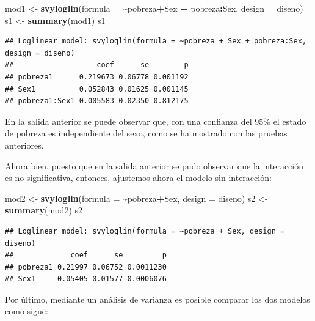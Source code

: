\documentclass[
  spanish,
  12pt,
]{book}
\newenvironment{Shaded}{\begin{snugshade}}{\end{snugshade}}
\newcommand{\AttributeTok}[1]{\textcolor[rgb]{0.13,0.29,0.53}{#1}}
\newcommand{\FunctionTok}[1]{\textcolor[rgb]{0.13,0.29,0.53}{\textbf{#1}}}
\newcommand{\NormalTok}[1]{#1}
\newcommand{\OtherTok}[1]{\textcolor[rgb]{0.56,0.35,0.01}{#1}}
\newcommand{\SpecialCharTok}[1]{\textcolor[rgb]{0.81,0.36,0.00}{\textbf{#1}}}
\begin{document}
\begin{Shaded}
\begin{Highlighting}[]
\NormalTok{mod1 }\OtherTok{\textless{}{-}} \FunctionTok{svyloglin}\NormalTok{(}\AttributeTok{formula =} \SpecialCharTok{\textasciitilde{}}\NormalTok{pobreza}\SpecialCharTok{+}\NormalTok{Sex }\SpecialCharTok{+}\NormalTok{ pobreza}\SpecialCharTok{:}\NormalTok{Sex, }
                    \AttributeTok{design =}\NormalTok{ diseno)}
\NormalTok{s1 }\OtherTok{\textless{}{-}} \FunctionTok{summary}\NormalTok{(mod1)}
\NormalTok{s1}
\end{Highlighting}
\end{Shaded}

\begin{verbatim}
## Loglinear model: svyloglin(formula = ~pobreza + Sex + pobreza:Sex, design = diseno)
##                   coef      se        p
## pobreza1      0.219673 0.06778 0.001192
## Sex1          0.052843 0.01625 0.001145
## pobreza1:Sex1 0.005583 0.02350 0.812175
\end{verbatim}

En la salida anterior se puede observar que, con una confianza del 95\% el estado de pobreza es independiente del sexo, como se ha mostrado con las pruebas anteriores.

Ahora bien, puesto que en la salida anterior se pudo observar que la interacción es no significativa, entonces, ajustemos ahora el modelo sin interacción:

\begin{Shaded}
\begin{Highlighting}[]
\NormalTok{mod2 }\OtherTok{\textless{}{-}} \FunctionTok{svyloglin}\NormalTok{(}\AttributeTok{formula =} \SpecialCharTok{\textasciitilde{}}\NormalTok{pobreza}\SpecialCharTok{+}\NormalTok{Sex, }
                  \AttributeTok{design =}\NormalTok{ diseno)}
\NormalTok{s2 }\OtherTok{\textless{}{-}} \FunctionTok{summary}\NormalTok{(mod2)}
\NormalTok{s2}
\end{Highlighting}
\end{Shaded}

\begin{verbatim}
## Loglinear model: svyloglin(formula = ~pobreza + Sex, design = diseno)
##             coef      se         p
## pobreza1 0.21997 0.06752 0.0011230
## Sex1     0.05405 0.01577 0.0006076
\end{verbatim}

Por último, mediante un análisis de varianza es posible comparar los dos modelos como sigue:
\end{document}
